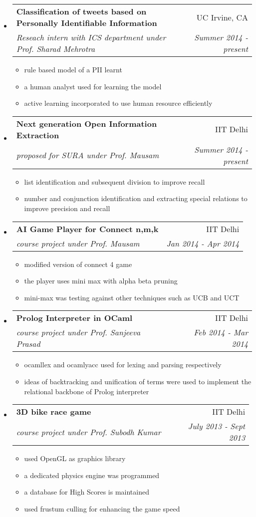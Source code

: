 \documentclass[letterpaper,11pt]{article}
\makeatletter
\newcommand{\ressubheading}[4]{
\begin{tabular*}{6.5in}{l@{\extracolsep{\fill}}r}
		\textbf{#1} & #2 \\
		\textit{#3} & \textit{#4} \\
\end{tabular*}\vspace{-6pt}}
\makeatother
\begin{document}
\begin{itemize}

\item 
\ressubheading{Classification of tweets based on Personally Identifiable Information}{UC Irvine, CA}{Reseach intern with ICS department under Prof. Sharad Mehrotra}{Summer 2014 - present}
\begin{itemize}
\item rule based model of a PII learnt
\item a human analyst used for learning the model
\item active learning incorporated to use human resource efficiently
\end{itemize}

\item
\ressubheading{Next generation Open Information Extraction}{IIT Delhi}{proposed for SURA under Prof. Mausam}{Summer 2014 - present}
\begin{itemize}
\item list identification and subsequent division to improve recall
\item number and conjunction identification and extracting special relations to improve precision and recall
\end{itemize}

\item
\ressubheading{AI Game Player for Connect n,m,k}{IIT Delhi}{course project under Prof. Mausam}{Jan 2014 - Apr 2014}
\begin{itemize}
\item modified version of connect 4 game
\item the player uses mini max with alpha beta pruning
\item mini-max was testing against other techniques such as UCB and UCT
\end{itemize}


\item
\ressubheading{Prolog Interpreter in OCaml}{IIT Delhi}{course project under Prof. Sanjeeva Prasad}{Feb 2014 - Mar 2014}
\begin{itemize}
\item ocamllex and ocamlyacc used for lexing and parsing respectively 
\item ideas of backtracking and unification of terms were used to implement the relational backbone of Prolog interpreter
\end{itemize}

\item
\ressubheading{3D bike race game}{IIT Delhi}{course project under Prof. Subodh Kumar}{July 2013 - Sept 2013­}
\begin{itemize}
\item used OpenGL as graphics library
\item a dedicated physics engine was programmed
\item a database for High Scores is maintained
\item used frustum culling for enhancing the game speed
\end{itemize}



\end{itemize}
\end{document}
